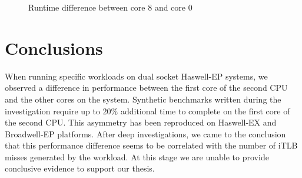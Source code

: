\documentclass[a4paper]{jpconf}
\begin{document}

\begin{figure}
\begin{center}
\caption{Runtime difference between core 8 and core 0}
\end{center}
\end{figure}

\section{Conclusions}
When running specific workloads on dual socket Haswell-EP systems, we observed a 
difference in performance between the first core of the second CPU and the other 
cores on the system. Synthetic benchmarks written during the investigation require up to 20\% additional 
time to complete on the first core of the second CPU. This asymmetry has been 
reproduced on Haswell-EX and Broadwell-EP platforms. After deep investigations, 
we came to the conclusion that this performance difference seems to be correlated 
with the number of iTLB misses generated by the workload. At this stage we are 
unable to provide conclusive evidence to support our thesis.
\end{document}
